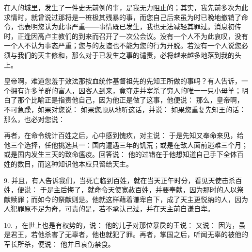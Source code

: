 在人的城里，发生了一件史无前例的事，是我无力阻止的；其实，我先前多次为此求情时，就曾说过那将是一桩极其残暴的事，而您自己后来虽为时已晚地撤销了命令，也表明您认为此事严重——事情既已发生，我也无法减轻其罪过。消息初传时，正逢因高卢主教们的到来而召开了一次公会议。没有一个人不为此哀叹，没有一个人不认为事态严重；您与的友谊也不能为您的行为开脱。若没有一个人说您必须与我们的天主修和，那么对于已发生之事的谴责，必将越来越多地落到我的头上。\par

皇帝啊，难道您羞于效法那按血统作基督祖先的先知王所做的事吗？有人告诉，一个拥有许多羊群的富人，因客人到来，竟夺走并宰杀了穷人的唯一一只小母羊；明白了那个比喻正是指责他自己，因为他正是做了这事，他便说： 那么，皇帝啊，不可急躁，如果对您说： 如果您顺从地听这话，并说： 如果您重复先知王的话： 那么，也必对您说：\par

再者，在命令统计百姓之后，心中感到愧疚，对主说： 于是先知又奉命来见，给他三个选择，任他挑选其一：国内遭遇三年的饥荒；或是在敌人面前逃难三个月；或是国内发生三天的致命瘟疫。回答说： 他的过错在于他想知道自己手下全体百姓的数目，而这种知识他本应只留给天主。\par

9. 并且，有人告诉我们，当死亡临到百姓，就在当天正午时分，看见天使击杀百姓，便说： 于是主后悔了，就命令天使宽赦百姓，并要奉献，因为那时的人以祭献赎罪；而如今的祭献则是。他就这样藉着谦卑自下，成了天主更悦纳的人，因为人犯罪原不足为奇，可责的是，若不承认己过，并在天主前自谦自卑。\par

10. ，在世上也是有权势的，说： 他的儿子对那位暴戾的王说： 又说： 因为，虽是君王，若他杀害了无辜者，他也就犯了罪。再者，掌国之后，听闻无辜的被他的军长所杀，便说： 他并且哀伤禁食。\par

